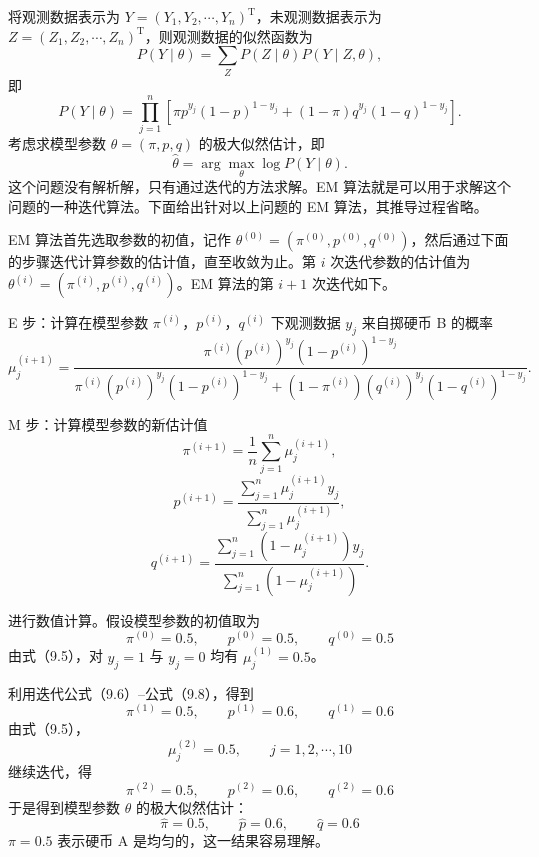 \documentclass[UTF8, 12pt, fontset=fandol, oneside]{ctexart}
\begin{document}
将观测数据表示为 $Y=(Y_1,Y_2,\cdots,Y_n)^{\mathrm T}$，未观测数据表示为 $Z=(Z_1,Z_2,\cdots,Z_n)^{\mathrm T}$，则观测数据的似然函数为
\begin{equation}
  P(Y\mid\theta)=\sum_Z P(Z\mid\theta)P(Y\mid Z,\theta),
  \tag{9.2}
\end{equation}
即
\begin{equation}
  P(Y\mid\theta)=\prod_{j=1}^n
  \left[\pi p^{y_j}(1-p)^{1-y_j}+(1-\pi)q^{y_j}(1-q)^{1-y_j}\right].
  \tag{9.3}
\end{equation}
考虑求模型参数 $\theta=(\pi,p,q)$ 的极大似然估计，即
\begin{equation}
  \hat{\theta}=\arg\max_{\theta}\log P(Y\mid\theta).
  \tag{9.4}
\end{equation}
这个问题没有解析解，只有通过迭代的方法求解。EM 算法就是可以用于求解这个问题的一种迭代算法。下面给出针对以上问题的 EM 算法，其推导过程省略。

EM 算法首先选取参数的初值，记作 $\theta^{(0)}=(\pi^{(0)},p^{(0)},q^{(0)})$，然后通过下面的步骤迭代计算参数的估计值，直至收敛为止。第 $i$ 次迭代参数的估计值为 $\theta^{(i)}=(\pi^{(i)},p^{(i)},q^{(i)})$。EM 算法的第 $i+1$ 次迭代如下。

E 步：计算在模型参数 $\pi^{(i)}$，$p^{(i)}$，$q^{(i)}$ 下观测数据 $y_j$ 来自掷硬币 B 的概率
\begin{equation}
  \mu_j^{(i+1)}
  =\frac{\pi^{(i)}(p^{(i)})^{y_j}(1-p^{(i)})^{1-y_j}}
  {\pi^{(i)}(p^{(i)})^{y_j}(1-p^{(i)})^{1-y_j}+
  (1-\pi^{(i)})(q^{(i)})^{y_j}(1-q^{(i)})^{1-y_j}}.
  \tag{9.5}
\end{equation}

M 步：计算模型参数的新估计值
\begin{equation}
  \pi^{(i+1)}=\frac1n\sum_{j=1}^n \mu_j^{(i+1)},
  \tag{9.6}
\end{equation}
\begin{equation}
  p^{(i+1)}
  =\frac{\sum_{j=1}^n \mu_j^{(i+1)}y_j}
  {\sum_{j=1}^n \mu_j^{(i+1)}},
  \tag{9.7}
\end{equation}
\begin{equation}
  q^{(i+1)}
  =\frac{\sum_{j=1}^n (1-\mu_j^{(i+1)})y_j}
  {\sum_{j=1}^n (1-\mu_j^{(i+1)})}.
  \tag{9.8}
\end{equation}

进行数值计算。假设模型参数的初值取为
\[
  \pi^{(0)}=0.5,\qquad p^{(0)}=0.5,\qquad q^{(0)}=0.5
\]
由式（9.5），对 $y_j=1$ 与 $y_j=0$ 均有 $\mu_j^{(1)}=0.5$。

利用迭代公式（9.6）--公式（9.8），得到
\[
  \pi^{(1)}=0.5,\qquad p^{(1)}=0.6,\qquad q^{(1)}=0.6
\]
由式（9.5），
\[
  \mu_j^{(2)}=0.5,\qquad j=1,2,\cdots,10
\]
继续迭代，得
\[
  \pi^{(2)}=0.5,\qquad p^{(2)}=0.6,\qquad q^{(2)}=0.6
\]
于是得到模型参数 $\theta$ 的极大似然估计：
\[
  \hat{\pi}=0.5,\qquad \hat{p}=0.6,\qquad \hat{q}=0.6
\]
$\pi=0.5$ 表示硬币 A 是均匀的，这一结果容易理解。
\end{document}
